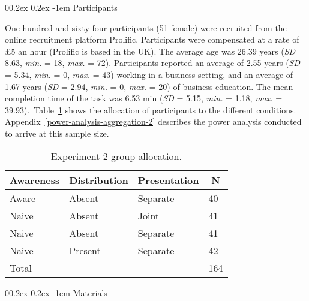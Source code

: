 \documentclass[
  english,
  man, donotrepeattitle,floatsintext]{apa7}
\makeatletter
\let\oldparagraph\paragraph
\renewcommand{\paragraph}[1]{\oldparagraph{#1}\mbox{}}
\renewcommand{\paragraph}{\@startsection{paragraph}{4}{\parindent}%
  {0\baselineskip \@plus 0.2ex \@minus 0.2ex}%
  {-1em}%
  {\normalfont\normalsize\bfseries\itshape\typesectitle}}
\theoremstyle{definition}
\theoremstyle{definition}
\theoremstyle{definition}
\theoremstyle{definition}
\theoremstyle{remark}
\makeatother
\begin{document}
\hypertarget{participants-1}{%
\paragraph{Participants}\label{participants-1}}

One hundred and sixty-four participants (51 female) were recruited from the online recruitment platform Prolific. Participants were compensated at a rate of \pounds 5 an hour (Prolific is based in the UK). The average age was 26.39 years (\emph{SD} = 8.63, \emph{min.} = 18, \emph{max.} = 72). Participants reported an average of 2.55 years (\emph{SD} = 5.34, \emph{min.} = 0, \emph{max.} = 43) working in a business setting, and an average of 1.67 years (\emph{SD} = 2.94, \emph{min.} = 0, \emph{max.} = 20) of business education. The mean completion time of the task was 6.53 min (\emph{SD} = 5.15, \emph{min.} = 1.18, \emph{max.} = 39.93).~Table~\ref{tab:condition-allocation-aggregation-2}
shows the allocation of participants to the different conditions.
Appendix~\ref{power-analysis-aggregation-2} describes the power analysis
conducted to arrive at this sample size.

\begin{table}[tbp]

\begin{center}
\begin{threeparttable}

\caption{\label{tab:condition-allocation-aggregation-2}Experiment 2 group allocation.}

\begin{tabular}{llll}
\toprule
Awareness & \multicolumn{1}{c}{Distribution} & \multicolumn{1}{c}{Presentation} & \multicolumn{1}{c}{N}\\
\midrule
Aware & Absent & Separate & 40\\
Naive & Absent & Joint & 41\\
Naive & Absent & Separate & 41\\
Naive & Present & Separate & 42\\
Total &  &  & 164\\
\bottomrule
\end{tabular}

\end{threeparttable}
\end{center}

\end{table}

\hypertarget{materials-1}{%
\paragraph{Materials}\label{materials-1}}
\end{document}
